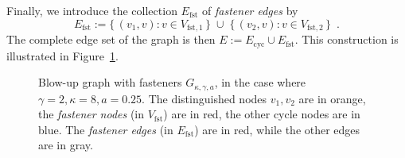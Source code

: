 \documentclass[final]{colt2026}
\newcommand{\1}{\mathbf{1}}
\begin{document}
Finally, we introduce the collection $E_{\mathrm{fst}}$ of \emph{fastener edges} by 
\[
E_{\mathrm{fst}} := \{\, (v_1,v) : v\in V_{\mathrm{fst},1} \,\}\;\cup\; \{\, (v_2,v) : v\in V_{\mathrm{fst},2} \,\}\enspace .
\]
The complete edge set of the graph is then $E := E_{\mathrm{cyc}} \cup E_{\mathrm{fst}}$. This construction is illustrated in Figure~\ref{fig:illBU}.



\vspace{-0.5cm}
\begin{figure}[h]
\begin{center}
\end{center}
\caption{Blow-up graph with fasteners $G_{\kappa,\gamma,a}$, in the case where $\gamma = 2, \kappa = 8, a=0.25$. The distinguished nodes $v_1,v_2$ are in orange, the {\it fastener nodes} (in $V_{\mathrm{fst}}$) are in red, the other cycle nodes are in blue. The {\it fastener edges} (in $E_{\mathrm{fst}}$) are in red, while the other edges are in gray.}\label{fig:illBU}
\end{figure}
\end{document}
